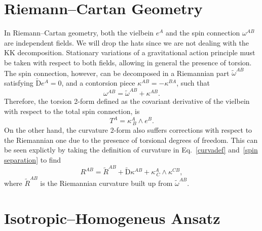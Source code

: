 \documentclass[aps,prd,12pt,superscriptaddress,showpacs,showkeys,longbibliography,reprint,nofootinbib]{revtex4-1}
\begin{document}
\appendix

\section{Riemann--Cartan Geometry\label{Riemann-Cartan}}

In Riemann--Cartan geometry, both the vielbein $e^A$ and the spin connection $\omega^{AB}$ are independent fields. We will drop the hats since we are not dealing with the KK decomposition. Stationary variations of a gravitational action principle must be taken with respect to both fields, allowing in general the presence of torsion. The spin connection, however, can be decomposed in a Riemannian part $\tilde{\omega}^{AB}$ satisfying $\tilde{\mbox{D}}e^A=0$, and a contorsion piece $\kappa^{AB}=-\kappa^{BA}$, such that 
\begin{equation}\label{spin separation}
  \omega^{AB}=\tilde{\omega}^{AB}+\kappa^{AB}.
\end{equation} 
Therefore, the torsion 2-form defined as the covariant derivative of the vielbein with respect to the total spin connection, is
\begin{equation}
  T^A=\kappa^A_{\ B}\wedge e^B.
\end{equation}
On the other hand, the curvature $2$-form also suffers corrections with respect to the Riemannian one due to the presence of torsional degrees of freedom. This can be seen explictly by taking the definition of curvature in Eq.~\eqref{curvadef} and~\eqref{spin separation} to find
\begin{equation}\label{curvature decomp}
  R^{AB} = \tilde{R}^{AB} + \tilde{\mbox{D}}\kappa^{AB} + \kappa^A_{\ C}\wedge\kappa^{CB},
\end{equation}
where $\tilde{R}^{AB}$ is the Riemannian curvature built up from $\tilde{\omega}^{AB}$.


\section{Isotropic--Homogeneus Ansatz\label{homotropic}}
\end{document}
